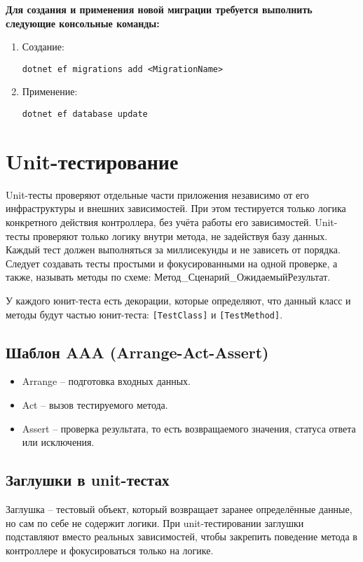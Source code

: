 \documentclass[a4paper,12pt]{report}
\begin{document}
\textbf{Для создания и применения новой миграции требуется выполнить следующие консольные команды:}
\begin{enumerate}
    \item
        Создание:

        \texttt{dotnet ef migrations add <MigrationName>}
    \item
        Применение:

        \texttt{dotnet ef database update}
\end{enumerate}

\section{Unit-тестирование}

Unit-тесты проверяют отдельные части приложения независимо от его инфраструктуры и внешних зависимостей. 
При этом тестируется только логика конкретного действия контроллера, без учёта работы его зависимостей.
Unit-тесты проверяют только логику внутри метода, не задействуя базу данных. Каждый тест должен выполняться 
за миллисекунды и не зависеть от порядка. Следует создавать тесты простыми и фокусированными на одной проверке, 
а также, называть методы по схеме: Метод\_Сценарий\_ОжидаемыйРезультат.

У каждого юнит-теста есть декорации, которые определяют, что данный класс и методы будут частью юнит-теста: 
\texttt{[TestClass]} и \texttt{[TestMethod]}.

\subsection{Шаблон AAA (Arrange-Act-Assert)}
\begin{itemize}
    \item
        Arrange -- подготовка входных данных.
    \item
        Act -- вызов тестируемого метода.
    \item
        Assert -- проверка результата, то есть возвращаемого значения, статуса ответа или исключения.
\end{itemize}

\subsection{Заглушки в unit-тестах}
Заглушка -- тестовый объект, который возвращает заранее определённые данные, 
но сам по себе не содержит логики. При unit-тестировании заглушки подставляют вместо реальных зависимостей, 
чтобы закрепить поведение метода в контроллере и фокусироваться только на логике.
\end{document}
